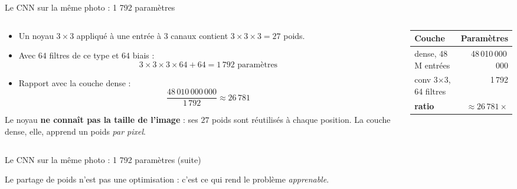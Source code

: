 \begin{frame}{Le CNN sur la même photo : 1 792 paramètres}
\begin{columns}[t]
\begin{column}{0.52\textwidth}
\begin{itemize}
  \item Un noyau $3 \times 3$ appliqué à une entrée à 3 canaux contient
  $3 \times 3 \times 3 = 27$ poids.
  \item Avec $64$ filtres de ce type et $64$ biais :
  \[
  3 \times 3 \times 3 \times 64 + 64 = 1\,792 \text{ paramètres}
  \]
  \item Rapport avec la couche dense :
  \[
  \frac{48\,010\,000\,000}{1\,792} \approx 26\,781
  \]
\end{itemize}
\begin{kbox}
Le noyau \textbf{ne connaît pas la taille de l'image} : ses $27$ poids sont
réutilisés à chaque position. La couche dense, elle, apprend un poids
\emph{par pixel}.
\end{kbox}
\end{column}
\begin{column}{0.44\textwidth}
\begin{center}
\begin{tabular}{@{}lr@{}}
\toprule
\textbf{Couche} & \textbf{Paramètres} \\
\midrule
dense, 48 M entrées & 48\,010\,000\,000 \\
conv 3$\times$3, 64 filtres & 1\,792 \\
\midrule
\textbf{ratio} & $\approx 26\,781\times$ \\
\bottomrule
\end{tabular}
\end{center}

\end{column}
\end{columns}
\end{frame}
\begin{frame}{Le CNN sur la même photo : 1 792 paramètres (suite)}
\begin{solbox}
Le partage de poids n'est pas une optimisation : c'est ce qui rend le
problème \emph{apprenable}.
\end{solbox}
\end{frame}

